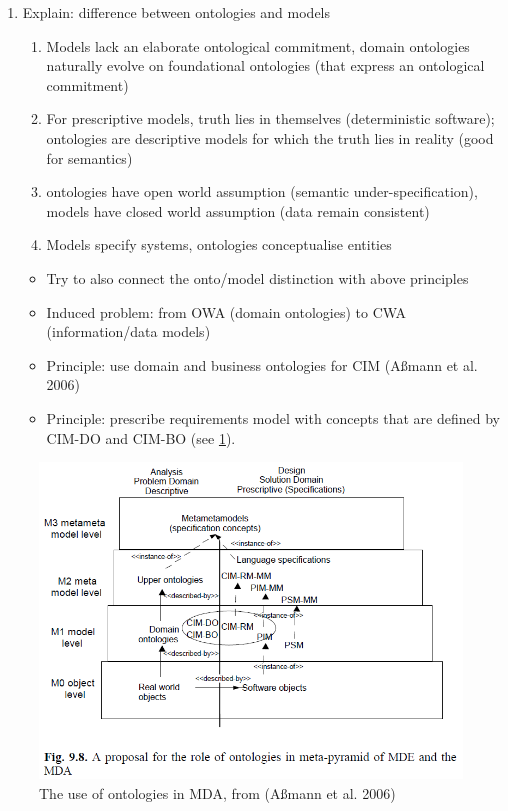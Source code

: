 \documentclass[a4paper,11pt,oneside,oldfontcommands]{memoir}
\theoremstyle{definition}
\theoremstyle{break}		%
\numberwithin{equation}{chapter}
\numberwithin{figure}{chapter}
\begin{document}
\begin{enumerate}
\def\labelenumi{\arabic{enumi}.}
\tightlist
\item
  Explain: difference between ontologies and models

  \begin{enumerate}
  \def\labelenumii{\roman{enumii}.}
  \tightlist
  \item
    Models lack an elaborate ontological commitment, domain ontologies
    naturally evolve on foundational ontologies (that express an
    ontological commitment)
  \item
    For prescriptive models, truth lies in themselves (deterministic
    software); ontologies are descriptive models for which the truth
    lies in reality (good for semantics)
  \item
    ontologies have open world assumption (semantic
    under-specification), models have closed world assumption (data
    remain consistent)
  \item
    Models specify systems, ontologies conceptualise entities
  \end{enumerate}

  \begin{itemize}
  \tightlist
  \item
    Try to also connect the onto/model distinction with above principles
  \item
    Induced problem: from OWA (domain ontologies) to CWA
    (information/data models)
  \item
    Principle: use domain and business ontologies for CIM (Aßmann et al.
    2006)
  \item
    Principle: prescribe requirements model with concepts that are
    defined by CIM-DO and CIM-BO (see \cref{fig:OntosInMDE}).
  \end{itemize}
\end{enumerate}

\begin{figure}
\hypertarget{fig:OntosInMDE}{%
\centering
\includegraphics{src/images/OntosInMDE.png}
\caption{The use of ontologies in MDA, from (Aßmann et al.
2006)}\label{fig:OntosInMDE}
}
\end{figure}
\end{document}
